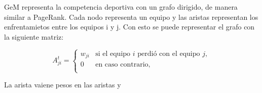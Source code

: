 GeM representa la competencia deportiva con un grafo dirigido, de manera similar a PageRank. Cada nodo representa un equipo y las aristas representan los enfrentamietos entre los equipos i y j. Con esto se puede representar el grafo con la siguiente matriz:

\begin{equation*}
A_{ji}^t = \left\{
  \begin{array}{cl}
  w_{ji} & \text{si el equipo } i \text{ perdi\'o con el equipo } j,\\
  0 & \text{en caso contrario, }\\
  \end{array} \right.
\end{equation*}

La arista vaiene pesos en las aristas y

